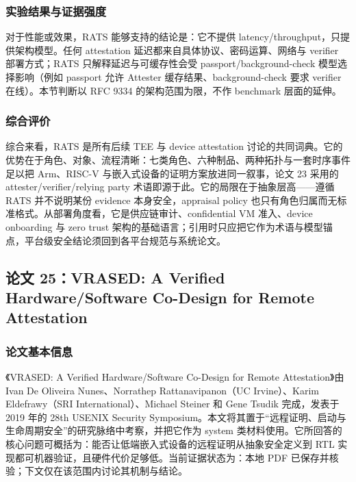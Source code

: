 \documentclass[11pt]{ctexart}
\begin{document}
\subsubsection{实验结果与证据强度}
对于性能或效果，RATS 能够支持的结论是：它不提供 latency/throughput，只提供架构模型。任何 attestation 延迟都来自具体协议、密码运算、网络与 verifier 部署方式；RATS 只解释延迟与可缓存性会受 passport/background-check 模型选择影响（例如 passport 允许 Attester 缓存结果、background-check 要求 verifier 在线）。本节判断以 RFC 9334 的架构范围为限，不作 benchmark 层面的延伸。\par
\subsubsection{综合评价}
综合来看，RATS 是所有后续 TEE 与 device attestation 讨论的共同词典。它的优势在于角色、对象、流程清晰：七类角色、六种制品、两种拓扑与一套时序事件足以把 Arm、RISC-V 与嵌入式设备的证明方案放进同一叙事，论文 23 采用的 attester/verifier/relying party 术语即源于此。它的局限在于抽象层高——遵循 RATS 并不说明某份 evidence 本身安全，appraisal policy 也只有角色归属而无标准格式。从部署角度看，它是供应链审计、confidential VM 准入、device onboarding 与 zero trust 架构的基础语言；引用时只应把它作为术语与模型锚点，平台级安全结论须回到各平台规范与系统论文。\par

\subsection{论文 25：VRASED: A Verified Hardware/Software Co-Design for Remote Attestation}
\subsubsection{论文基本信息}
《VRASED: A Verified Hardware/Software Co-Design for Remote Attestation》由 Ivan De Oliveira Nunes、Norrathep Rattanavipanon（UC Irvine）、Karim Eldefrawy（SRI International）、Michael Steiner 和 Gene Tsudik 完成，发表于 2019 年的 28th USENIX Security Symposium。本文将其置于“远程证明、启动与生命周期安全”的研究脉络中考察，并把它作为 system 类材料使用。它所回答的核心问题可概括为：能否让低端嵌入式设备的远程证明从抽象安全定义到 RTL 实现都可机器验证，且硬件代价足够低。当前证据状态为：本地 PDF 已保存并核验；下文仅在该范围内讨论其机制与结论。\cite{nunes2019vrased}\par
\end{document}
